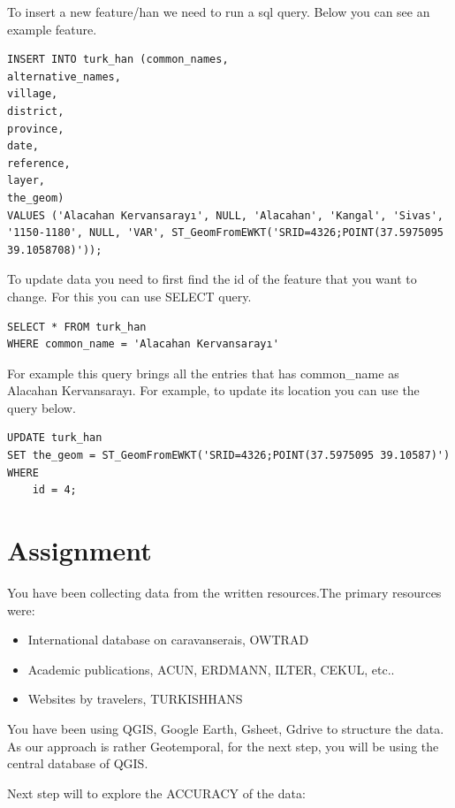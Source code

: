 \documentclass[
]{book}
\providecommand{\tightlist}{%
  \setlength{\itemsep}{0pt}\setlength{\parskip}{0pt}}
\begin{document}
To insert a new feature/han we need to run a sql query. Below you can see an example feature.

\begin{verbatim}
INSERT INTO turk_han (common_names, 
alternative_names, 
village, 
district, 
province, 
date, 
reference, 
layer, 
the_geom) 
VALUES ('Alacahan Kervansarayı', NULL, 'Alacahan', 'Kangal', 'Sivas', '1150-1180', NULL, 'VAR', ST_GeomFromEWKT('SRID=4326;POINT(37.5975095 39.1058708)'));
\end{verbatim}

To update data you need to first find the id of the feature that you want to change. For this you can use SELECT query.

\begin{verbatim}
SELECT * FROM turk_han
WHERE common_name = 'Alacahan Kervansarayı'
\end{verbatim}

For example this query brings all the entries that has common\_name as Alacahan Kervansarayı. For example, to update its location you can use the query below.

\begin{verbatim}
UPDATE turk_han
SET the_geom = ST_GeomFromEWKT('SRID=4326;POINT(37.5975095 39.10587)')
WHERE
    id = 4;
\end{verbatim}

\hypertarget{assignment}{%
\chapter{Assignment}\label{assignment}}

You have been collecting data from the written resources.The primary resources were:

\begin{itemize}
\tightlist
\item
  International database on caravanserais, OWTRAD
\item
  Academic publications, ACUN, ERDMANN, ILTER, CEKUL, etc..
\item
  Websites by travelers, TURKISHHANS
\end{itemize}

You have been using QGIS, Google Earth, Gsheet, Gdrive to structure the data. As our approach is rather Geotemporal, for the next step, you will be using the central database of QGIS.

Next step will to explore the ACCURACY of the data:
\end{document}
